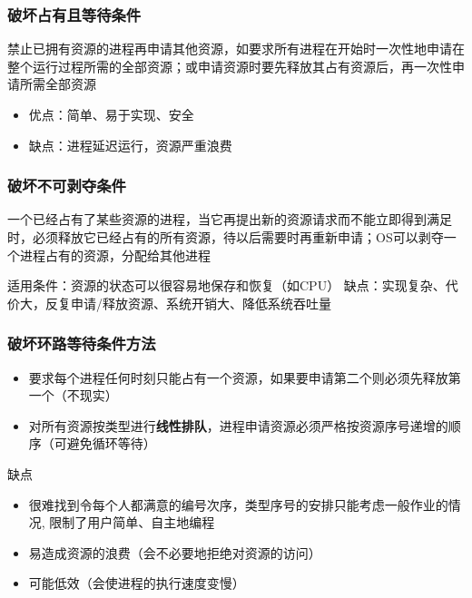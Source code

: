 \subsubsection{破坏占有且等待条件}
禁止已拥有资源的进程再申请其他资源，如要求所有进程在开始时一次性地申请在整个运行过程所需的全部资源；或申请资源时要先释放其占有资源后，再一次性申请所需全部资源
\begin{itemize}
    \item 优点：简单、易于实现、安全
    \item 缺点：进程延迟运行，资源严重浪费
\end{itemize}

\subsubsection{破坏不可剥夺条件}
一个已经占有了某些资源的进程，当它再提出新的资源请求而不能立即得到满足时，必须释放它已经占有的所有资源，待以后需要时再重新申请；OS可以剥夺一个进程占有的资源，分配给其他进程

适用条件：资源的状态可以很容易地保存和恢复（如CPU）
缺点：实现复杂、代价大，反复申请/释放资源、系统开销大、降低系统吞吐量

\subsubsection{破坏环路等待条件方法}
\begin{itemize}
    \item 要求每个进程任何时刻只能占有一个资源，如果要申请第二个则必须先释放第一个（不现实）
    \item 对所有资源按类型进行\textbf{线性排队}，进程申请资源必须严格按资源序号递增的顺序（可避免循环等待）
\end{itemize}

缺点
\begin{itemize}
    \item 很难找到令每个人都满意的编号次序，类型序号的安排只能考虑一般作业的情况, 限制了用户简单、自主地编程
    \item 易造成资源的浪费（会不必要地拒绝对资源的访问）
    \item 可能低效（会使进程的执行速度变慢）
\end{itemize}

